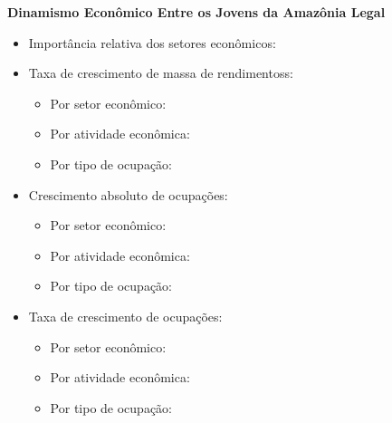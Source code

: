 \documentclass[8pt]{beamer}
\begin{document}
\begin{frame}[label=indice_principal_amz_jovem]{}

\textit{\hyperlink{indice_principal}{}}

\textbf{Dinamismo Econômico Entre os Jovens da Amazônia Legal}
\vspace{2mm}

\begin{itemize}

\item{Importância relativa dos setores econômicos: \hyperlink{_amz_jovem_importancia_relativa}{}}
\vspace{1mm}

\item{Taxa de crescimento  de massa de rendimentoss:
	\begin{itemize}
	\item{Por setor econômico: \hyperlink{amzjovemrkngtxmassaporsetor}{}}
	\item{Por atividade econômica: \hyperlink{amzjovemrkngtxmassaporatividade}{}}
	\item{Por tipo de ocupação: \hyperlink{amzjovemrkngtxmassaporocupacao}{}}
	\end{itemize}
}
\vspace{1mm}

\item{Crescimento  absoluto de ocupações:
	\begin{itemize}
	\item{Por setor econômico: \hyperlink{amzjovemrkngnocuporsetor}{}}
	\item{Por atividade econômica: \hyperlink{amzjovemrkngnocuporatividade}{}}
	\item{Por tipo de ocupação: \hyperlink{amzjovemrkngnocuporocupacao}{}}
	\end{itemize}
}
\vspace{1mm}

\item{Taxa de crescimento de ocupações:
	\begin{itemize}
	\item{Por setor econômico: \hyperlink{amzjovemrkngtxocuporsetor}{}}
	\item{Por atividade econômica: \hyperlink{amzjovemrkngtxocuporatividade}{}}
	\item{Por tipo de ocupação: \hyperlink{amzjovemrkngtxocuporocupacao}{}}
	\end{itemize}
}
\vspace{1mm}


\end{itemize}
\end{frame}
\end{document}
